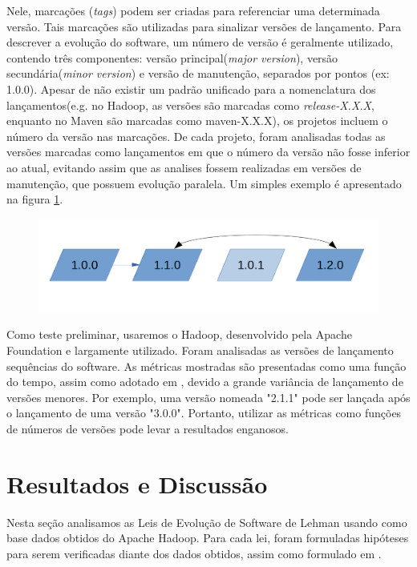 Nele, marcações (\textit{tags}) podem ser criadas para referenciar uma determinada versão. Tais marcações são utilizadas para sinalizar versões de lançamento. Para descrever a evolução do software, um número de versão é geralmente utilizado, contendo três componentes: versão principal(\textit{major version}), versão secundária(\textit{minor version}) e versão de manutenção, separados por pontos (ex: 1.0.0).  Apesar de não existir um padrão unificado para a nomenclatura dos lançamentos(e.g. no Hadoop, as versões são marcadas como \textit{release-X.X.X}, enquanto no Maven são marcadas como maven-X.X.X), os projetos incluem o número da versão nas marcações. De cada projeto, foram analisadas todas as versões marcadas como lançamentos em que o número da versão não fosse inferior ao atual, evitando assim que as analises fossem realizadas em versões de manutenção, que possuem evolução paralela. Um simples exemplo é apresentado na figura \ref{fig:selecaoversoes}.
\begin{figure}[h]
	\centering
	\includegraphics[width=0.7\linewidth]{figure/selecao_versoes}
	\caption{}
	\label{fig:selecaoversoes}
\end{figure}
Como teste preliminar, usaremos o Hadoop, desenvolvido pela Apache Foundation e largamente utilizado. Foram analisadas as versões de lançamento sequências do software. As métricas mostradas são presentadas como uma função do tempo, assim como adotado em \cite{israeli2010linux}, devido a grande variância de lançamento de versões menores. Por exemplo, uma versão nomeada "2.1.1" pode ser lançada após o lançamento de uma versão "3.0.0". Portanto, utilizar as métricas como funções de números de versões pode levar a resultados enganosos.


\section{Resultados e Discussão} \label{sec:resultados}

Nesta seção analisamos as Leis de Evolução de Software de Lehman usando como base dados obtidos do Apache Hadoop. Para cada lei, foram formuladas hipóteses para serem verificadas diante dos dados obtidos, assim como formulado em \cite{neamtiu2013towards}.

